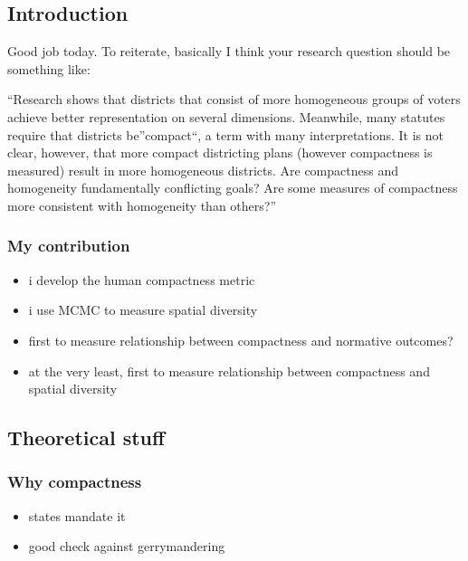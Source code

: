 \documentclass[]{article}
\author{Zhenghong Lieu}
\date{}
\providecommand{\tightlist}{%
  \setlength{\itemsep}{0pt}\setlength{\parskip}{0pt}}
\begin{document}
\hypertarget{introduction}{%
\subsection{Introduction}\label{introduction}}

Good job today. To reiterate, basically I think your research question
should be something like:

``Research shows that districts that consist of more homogeneous groups
of voters achieve better representation on several dimensions.
Meanwhile, many statutes require that districts be''compact``, a term
with many interpretations. It is not clear, however, that more compact
districting plans (however compactness is measured) result in more
homogeneous districts. Are compactness and homogeneity fundamentally
conflicting goals? Are some measures of compactness more consistent with
homogeneity than others?''

\hypertarget{my-contribution}{%
\subsubsection{My contribution}\label{my-contribution}}

\begin{itemize}
\tightlist
\item
  i develop the human compactness metric
\item
  i use MCMC to measure spatial diversity
\item
  first to measure relationship between compactness and normative
  outcomes?
\item
  at the very least, first to measure relationship between compactness
  and spatial diversity
\end{itemize}

\hypertarget{theoretical-stuff}{%
\subsection{Theoretical stuff}\label{theoretical-stuff}}

\hypertarget{why-compactness}{%
\subsubsection{Why compactness}\label{why-compactness}}

\begin{itemize}
\tightlist
\item
  states mandate it
\item
  good check against gerrymandering
\end{itemize}
\end{document}
